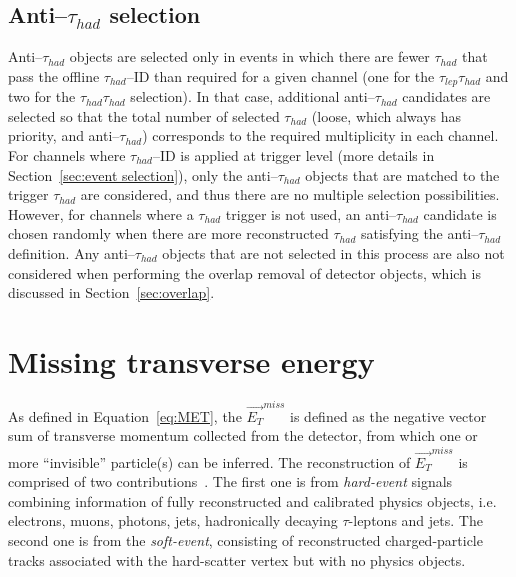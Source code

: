 \subsection{Anti--$\tau_{had}$ selection}
Anti--$\tau_{had}$ objects are selected only in events 
in which there are fewer $\tau_{had}$ that pass the offline $\tau_{had}$--ID than
required for a given channel (one for the $\tau_{lep}\tau_{had}$ 
and two for the $\tau_{had}$$\tau_{had}$ selection). 
In that case, additional anti--$\tau_{had}$ candidates are selected 
so that the total number of selected $\tau_{had}$ (loose, which always has priority,
and anti--$\tau_{had}$) corresponds to the required multiplicity in each channel.
For channels where $\tau_{had}$--ID is applied at trigger level 
(more details in Section~\ref{sec:event selection}), 
only the anti--$\tau_{had}$ objects that are matched to the
trigger $\tau_{had}$ are considered, and thus there are 
no multiple selection possibilities. 
However, for channels where a $\tau_{had}$ trigger is not used, 
an anti--$\tau_{had}$ candidate is chosen randomly when there are more reconstructed
$\tau_{had}$ satisfying the anti--$\tau_{had}$ definition. 
Any anti--$\tau_{had}$ objects that are not selected in this process are also not
considered when performing the overlap removal of detector objects, 
which is discussed in Section~\ref{sec:overlap}.

\section{Missing transverse energy}
As defined in Equation~\ref{eq:MET}, the $\vec{E_T}^{miss}$ is defined 
as the negative vector sum of transverse momentum collected from the 
detector, from which one or more ``invisible'' particle(s) can be inferred. 
The reconstruction of $\vec{E_T}^{miss}$ is comprised of two contributions~\cite{MET2018}. 
The first one is from \textit{hard-event} signals combining 
information of fully reconstructed and calibrated 
physics objects, i.e. electrons, muons, photons, jets,
hadronically decaying $\tau$-leptons and jets. 
The second one is from the \textit{soft-event}, consisting of 
reconstructed charged-particle tracks associated with the hard-scatter
vertex but with no physics objects.

